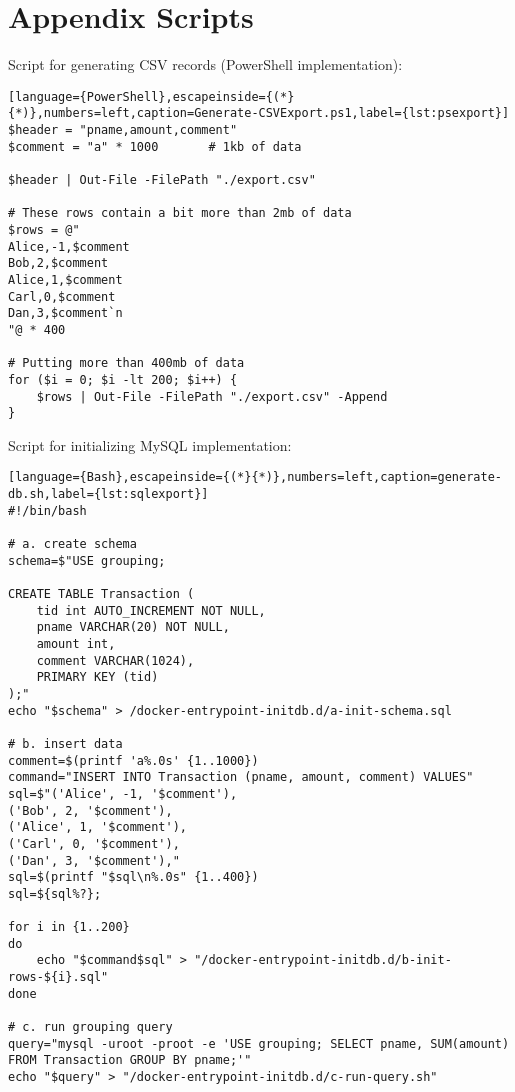 \appendix
\section*{Appendix Scripts}

Script for generating CSV records (PowerShell implementation):

\begin{lstlisting}[language={PowerShell},escapeinside={(*}{*)},numbers=left,caption=Generate-CSVExport.ps1,label={lst:psexport}]
$header = "pname,amount,comment"
$comment = "a" * 1000       # 1kb of data

$header | Out-File -FilePath "./export.csv"

# These rows contain a bit more than 2mb of data
$rows = @"
Alice,-1,$comment
Bob,2,$comment
Alice,1,$comment
Carl,0,$comment
Dan,3,$comment`n
"@ * 400

# Putting more than 400mb of data
for ($i = 0; $i -lt 200; $i++) {
    $rows | Out-File -FilePath "./export.csv" -Append
}
\end{lstlisting}
Script for initializing MySQL implementation:

\begin{lstlisting}[language={Bash},escapeinside={(*}{*)},numbers=left,caption=generate-db.sh,label={lst:sqlexport}]
#!/bin/bash

# a. create schema
schema=$"USE grouping;

CREATE TABLE Transaction (
    tid int AUTO_INCREMENT NOT NULL,
    pname VARCHAR(20) NOT NULL,
    amount int,
    comment VARCHAR(1024),
    PRIMARY KEY (tid)
);"
echo "$schema" > /docker-entrypoint-initdb.d/a-init-schema.sql

# b. insert data
comment=$(printf 'a%.0s' {1..1000})
command="INSERT INTO Transaction (pname, amount, comment) VALUES"
sql=$"('Alice', -1, '$comment'),
('Bob', 2, '$comment'),
('Alice', 1, '$comment'),
('Carl', 0, '$comment'),
('Dan', 3, '$comment'),"
sql=$(printf "$sql\n%.0s" {1..400})
sql=${sql%?};       

for i in {1..200}
do
    echo "$command$sql" > "/docker-entrypoint-initdb.d/b-init-rows-${i}.sql"
done

# c. run grouping query
query="mysql -uroot -proot -e 'USE grouping; SELECT pname, SUM(amount) FROM Transaction GROUP BY pname;'"
echo "$query" > "/docker-entrypoint-initdb.d/c-run-query.sh"
\end{lstlisting}